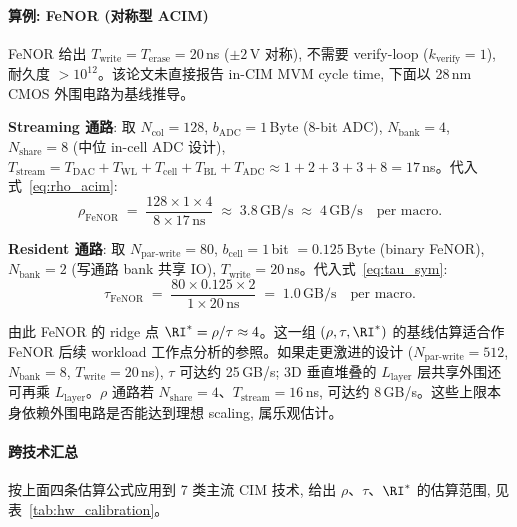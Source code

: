 \paragraph{算例: FeNOR (对称型 ACIM)}
FeNOR 给出 $T_{\mathrm{write}} = T_{\mathrm{erase}} = 20$\,ns ($\pm 2$\,V 对称), 不需要 verify-loop ($k_{\mathrm{verify}} = 1$), 耐久度 $> 10^{12}$。该论文未直接报告 in-CIM MVM cycle time, 下面以 28\,nm CMOS 外围电路为基线推导。

\textbf{Streaming 通路}: 取 $N_{\mathrm{col}} = 128$, $b_{\mathrm{ADC}} = 1$\,Byte (8-bit ADC), $N_{\mathrm{bank}} = 4$, $N_{\mathrm{share}} = 8$ (中位 in-cell ADC 设计), $T_{\mathrm{stream}} = T_{\mathrm{DAC}} + T_{\mathrm{WL}} + T_{\mathrm{cell}} + T_{\mathrm{BL}} + T_{\mathrm{ADC}} \approx 1 + 2 + 3 + 3 + 8 = 17$\,ns。代入式~\eqref{eq:rho_acim}:
\[
\rho_{\mathrm{FeNOR}} \;=\; \frac{128 \times 1 \times 4}{8 \times 17\,\mathrm{ns}} \;\approx\; 3.8\,\mathrm{GB/s} \;\approx\; 4\,\mathrm{GB/s} \quad \text{per macro}.
\]

\textbf{Resident 通路}: 取 $N_{\mathrm{par\text{-}write}} = 80$, $b_{\mathrm{cell}} = 1$\,bit $= 0.125$\,Byte (binary FeNOR), $N_{\mathrm{bank}} = 2$ (写通路 bank 共享 IO), $T_{\mathrm{write}} = 20$\,ns。代入式~\eqref{eq:tau_sym}:
\[
\tau_{\mathrm{FeNOR}} \;=\; \frac{80 \times 0.125 \times 2}{1 \times 20\,\mathrm{ns}} \;=\; 1.0\,\mathrm{GB/s} \quad \text{per macro}.
\]

由此 FeNOR 的 ridge 点 $\RI^{*} = \rho/\tau \approx 4$。这一组 $(\rho, \tau, \RI^{*})$ 的基线估算适合作 FeNOR 后续 workload 工作点分析的参照。如果走更激进的设计 ($N_{\mathrm{par\text{-}write}} = 512$, $N_{\mathrm{bank}} = 8$, $T_{\mathrm{write}} = 20$\,ns), $\tau$ 可达约 25\,GB/s; 3D 垂直堆叠的 $L_{\mathrm{layer}}$ 层共享外围还可再乘 $L_{\mathrm{layer}}$。$\rho$ 通路若 $N_{\mathrm{share}} = 4$、$T_{\mathrm{stream}} = 16$\,ns, 可达约 8\,GB/s。这些上限本身依赖外围电路是否能达到理想 scaling, 属乐观估计。

\paragraph{跨技术汇总}
按上面四条估算公式应用到 7 类主流 CIM 技术, 给出 $\rho$、$\tau$、$\RI^{*}$ 的估算范围, 见表~\ref{tab:hw_calibration}。

